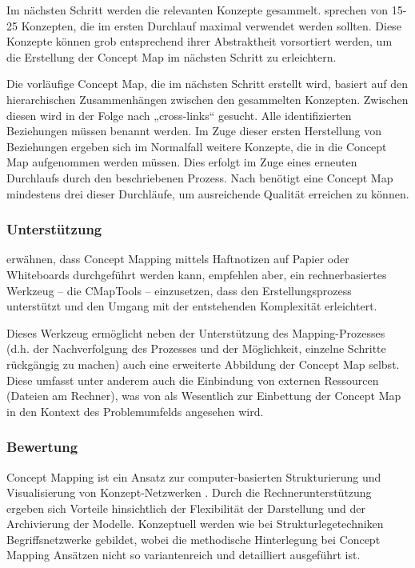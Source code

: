 Im nächsten Schritt werden die relevanten Konzepte gesammelt. \citet{Novak06} sprechen von 15-25 Konzepten, die im ersten Durchlauf maximal verwendet werden sollten. Diese Konzepte können grob entsprechend ihrer Abstraktheit vorsortiert werden, um die Erstellung der Concept Map im nächsten Schritt zu erleichtern.

Die vorläufige Concept Map, die im nächsten Schritt erstellt wird, basiert auf den hierarchischen Zusammenhängen zwischen den gesammelten Konzepten. Zwischen diesen wird in der Folge nach „cross-links“ gesucht. Alle identifizierten Beziehungen müssen benannt werden. Im Zuge dieser ersten Herstellung von Beziehungen ergeben sich im Normalfall weitere Konzepte, die in die Concept Map aufgenommen werden müssen. Dies erfolgt im Zuge eines erneuten Durchlaufs durch den beschriebenen Prozess. Nach \citet{Novak06} benötigt eine Concept Map mindestens drei dieser Durchläufe, um ausreichende Qualität erreichen zu können.

\subsubsection{Unterstützung}

\citet{Novak06} erwähnen, dass Concept Mapping mittels Haftnotizen auf Papier oder Whiteboards durchgeführt werden kann, empfehlen aber, ein rechnerbasiertes Werkzeug -- die CMapTools \citep{Canas04} -- einzusetzen, dass den Erstellungsprozess unterstützt und den Umgang mit der entstehenden Komplexität erleichtert.

Dieses Werkzeug ermöglicht neben der Unterstützung des Mapping-Prozesses (d.h. der Nachverfolgung des Prozesses und der Möglichkeit, einzelne Schritte rückgängig zu machen) auch eine erweiterte Abbildung der Concept Map selbst. Diese umfasst unter anderem auch die Einbindung von externen Ressourcen (Dateien am Rechner), was von \citet{Novak06} als Wesentlich zur Einbettung der Concept Map in den Kontext des Problemumfelds angesehen wird.

\subsubsection{Bewertung}

Concept Mapping ist ein Ansatz zur computer-basierten Strukturierung und Visualisierung von Konzept-Netzwerken \citep{Novak06}. Durch die Rechnerunterstützung ergeben sich Vorteile hinsichtlich der Flexibilität der Darstellung und der Archivierung der Modelle. Konzeptuell werden wie bei Strukturlegetechniken Begriffsnetzwerke gebildet, wobei die methodische Hinterlegung bei Concept Mapping Ansätzen nicht so variantenreich und detailliert ausgeführt ist. 

